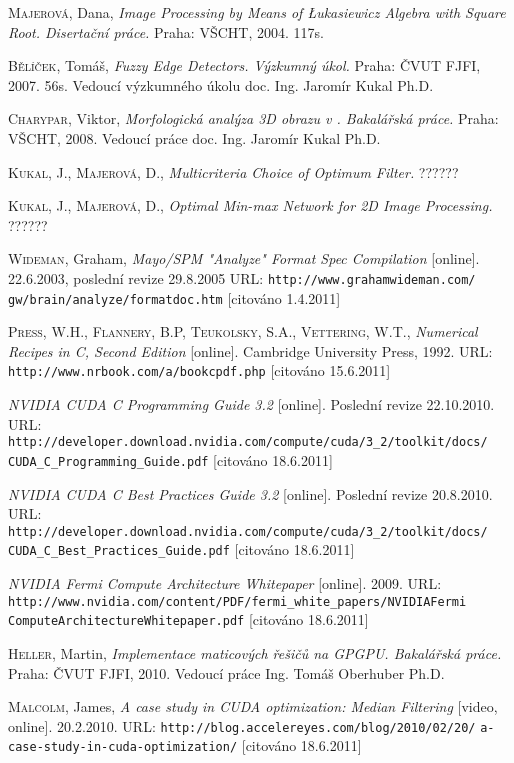 \begin{thebibliography}{99}
        \textsc{Majerová}, Dana, \textit{Image Processing by Means of \L ukasiewicz Algebra with Square Root.
        Disertační práce.} Praha: VŠCHT, 2004. 117s. 

         \textsc{Bělíček}, Tomáš, \textit{Fuzzy Edge Detectors.
        Výzkumný úkol.} Praha: ČVUT FJFI, 2007. 56s. Vedoucí výzkumného úkolu doc. Ing. Jaromír Kukal Ph.D.

         \textsc{Charypar}, Viktor, \textit{Morfologická analýza 3D obrazu v \Cpp.
        Bakalářská práce.} Praha: VŠCHT, 2008. Vedoucí práce doc. Ing. Jaromír Kukal Ph.D.

        \textsc{Kukal}, J., \textsc{Majerová}, D., \textit{Multicriteria Choice of Optimum Filter.
        } ??????

        \textsc{Kukal}, J., \textsc{Majerová}, D., \textit{Optimal Min-max Network for 2D Image Processing.
        } ??????

        \textsc{Wideman}, Graham, \textit{Mayo/SPM "Analyze" Format Spec Compilation} [online]. 22.6.2003, poslední revize 29.8.2005 
        URL: \texttt{http://www.grahamwideman.com/} {\tt gw/brain/analyze/formatdoc.htm} [citováno 1.4.2011]

        \textsc{Press}, W.H., \textsc{Flannery}, B.P, \textsc{Teukolsky}, S.A., \textsc{Vettering}, W.T.,
        \textit{Numerical Recipes in C, Second Edition} [online]. Cambridge University Press, 1992.
        URL: {\tt http://www.nrbook.com/a/bookcpdf.php} [citováno 15.6.2011]

        \textit{NVIDIA CUDA C Programming Guide 3.2} [online]. Poslední revize 22.10.2010.
        URL: {\tt http://developer.download.nvidia.com/compute/cuda/3\_2/toolkit/docs/} {\tt CUDA\_C\_Programming\_Guide.pdf} [citováno 18.6.2011]

        \textit{NVIDIA CUDA C Best Practices Guide 3.2} [online]. Poslední revize 20.8.2010.
        URL: {\tt  http://developer.download.nvidia.com/compute/cuda/3\_2/toolkit/docs/} {\tt CUDA\_C\_Best\_Practices\_Guide.pdf} [citováno 18.6.2011]

        \textit{NVIDIA Fermi Compute Architecture Whitepaper} [online]. 2009.
        URL: {\tt http://www.nvidia.com/content/PDF/fermi\_white\_papers/NVIDIAFermi} {\tt ComputeArchitectureWhitepaper.pdf} [citováno 18.6.2011]

        \textsc{Heller}, Martin, \textit{Implementace maticových řešičů na GPGPU.
        Bakalářská práce.} Praha: ČVUT FJFI, 2010. Vedoucí práce Ing. Tomáš Oberhuber Ph.D.

        \textsc{Malcolm}, James, \textit{A case study in CUDA optimization: Median Filtering} [video, online]. 20.2.2010.
        URL: {\tt http://blog.accelereyes.com/blog/2010/02/20/} {\tt a-case-study-in-cuda-optimization/} [citováno 18.6.2011]

\end{thebibliography} 